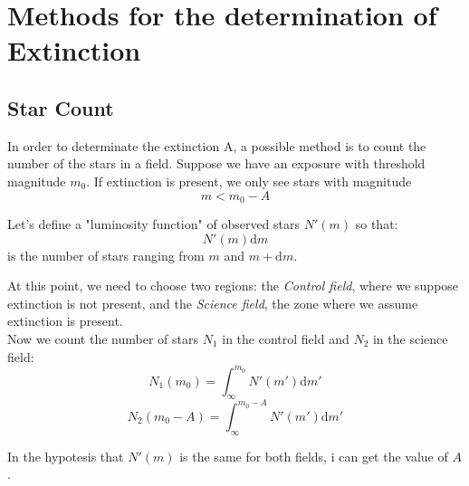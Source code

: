 \documentclass[a4paper,11pt,twoside]{book}
\newcommand{\de}[0]{\textrm{d}}
\begin{document}
\chapter{Methods for the determination of Extinction}

\section{Star Count}
In order to determinate the extinction A, a possible method is to count the number of the stars in a field. Suppose we have an exposure with threshold magnitude $m_0$. If extinction is present, we only see stars with magnitude 
\begin{equation}
	m < m_0 - A
\end{equation}

Let's define a "luminosity function" of observed stars $N'(m)$ so that:
\begin{equation}
	N'(m)\de m
\end{equation}
is the number of stars ranging from $m$ and $m+\de m$.

At this point, we need to choose two regions: the \textit{Control field}, where we suppose extinction is not present, and the \textit{Science field}, the zone where we assume extinction is present.\\

Now we count the number of stars $N_1$ in the control field and $N_2$ in the science field:
\begin{equation}
	N_1(m_0) = \int_{\infty}^{m_0} N'(m')\de m'
\end{equation}
\begin{equation}
	N_2(m_0-A) = \int_{\infty}^{m_0-A} N'(m')\de m'
\end{equation}

In the hypotesis that $N'(m)$ is the same for both fields, i can get the value of $A$.
\begin{center}
\end{center}
\end{document}
